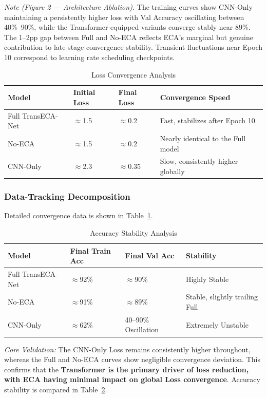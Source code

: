 \documentclass[sigconf]{acmart}
\begin{document}
\textit{Note (Figure 2 --- Architecture Ablation).} The training curves show CNN-Only maintaining a persistently higher loss with Val Accuracy oscillating between 40\%--90\%, while the Transformer-equipped variants converge stably near 89\%. The 1--2pp gap between Full and No-ECA reflects ECA's marginal but genuine contribution to late-stage convergence stability. Transient fluctuations near Epoch 10 correspond to learning rate scheduling checkpoints.




\begin{table}[!t]
\caption{Loss Convergence Analysis}
\label{tab:loss_conv}
\begin{tabular}{p{4.0cm}p{2.5cm}p{2.5cm}p{7.4cm}}
\toprule
\textbf{Model} & \textbf{Initial Loss} & \textbf{Final Loss} & \textbf{Convergence Speed} \\
\midrule
Full TransECA-Net & $\approx$1.5 & $\approx$0.2 & Fast, stabilizes after Epoch 10 \\
No-ECA & $\approx$1.5 & $\approx$0.2 & Nearly identical to the Full model \\
CNN-Only & $\approx$2.3 & $\approx$0.35 & Slow, consistently higher globally \\
\bottomrule
\end{tabular}
\end{table}

\subsubsection{Data-Tracking Decomposition} Detailed convergence data is shown in Table~\ref{tab:loss_conv}.


\begin{table}[!t]
\caption{Accuracy Stability Analysis}
\label{tab:acc_stab}
\begin{tabular}{p{4.0cm}p{3.0cm}p{3.5cm}p{5.9cm}}
\toprule
\textbf{Model} & \textbf{Final Train Acc} & \textbf{Final Val Acc} & \textbf{Stability} \\
\midrule
Full TransECA-Net & $\approx$92\% & $\approx$90\% & Highly Stable \\
No-ECA & $\approx$91\% & $\approx$89\% & Stable, slightly trailing Full \\
CNN-Only & $\approx$62\% & 40--90\% Oscillation & Extremely Unstable \\
\bottomrule
\end{tabular}
\end{table}

\textit{Core Validation:} The CNN-Only Loss remains consistently higher throughout, whereas the Full and No-ECA curves show negligible convergence deviation. This confirms that the \textbf{Transformer is the primary driver of loss reduction, with ECA having minimal impact on global Loss convergence}. Accuracy stability is compared in Table~\ref{tab:acc_stab}.
\end{document}
